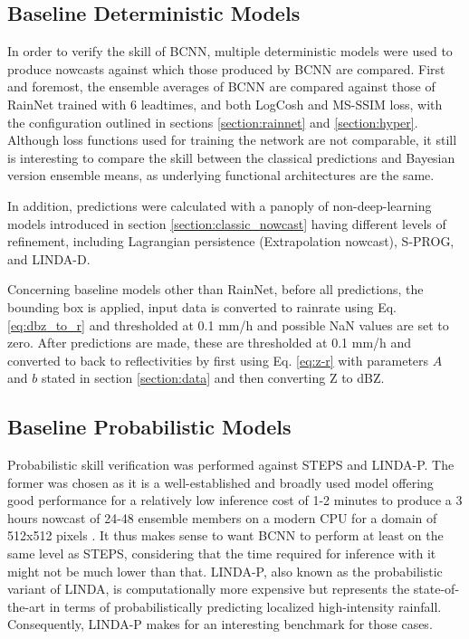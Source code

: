 \subsection{Baseline Deterministic Models}
\label{section:det_models}

In order to verify the skill of BCNN, multiple deterministic models were used to produce nowcasts against which those produced by BCNN are compared. First and foremost, the ensemble averages of BCNN are compared against those of RainNet trained with 6 leadtimes, and both LogCosh and MS-SSIM loss, with the configuration outlined in sections \ref{section:rainnet} and \ref{section:hyper}. Although loss functions used for training the network are not comparable, it still is interesting to compare the skill between the classical predictions and Bayesian version ensemble means, as underlying functional architectures are the same.

In addition, predictions were calculated with a panoply of non-deep-learning models introduced in section \ref{section:classic_nowcast} having different levels of refinement, including Lagrangian persistence (Extrapolation nowcast), S-PROG, and LINDA-D.

Concerning baseline models other than RainNet, before all predictions, the bounding box is applied, input data is converted to rainrate using Eq. \ref{eq:dbz_to_r} and thresholded at 0.1 mm/h and possible NaN values are set to zero. After predictions are made, these are thresholded at 0.1 mm/h and converted to back to reflectivities by first using Eq. \ref{eq:z-r} with parameters $A$ and $b$ stated in section \ref{section:data} and then converting Z to dBZ.


\subsection{Baseline Probabilistic Models}

Probabilistic skill verification was performed against STEPS and LINDA-P. The former was chosen as it is a well-established and broadly used model offering good performance for a relatively low inference cost of 1-2 minutes to produce a 3 hours nowcast of 24-48 ensemble members on a modern CPU for a domain of 512x512 pixels \cite{pulkkinen_pysteps_2019}. It thus makes sense to want BCNN to perform at least on the same level as STEPS, considering that the time required for inference with it might not be much lower than that. LINDA-P, also known as the probabilistic variant of LINDA, is computationally more expensive but represents the state-of-the-art in terms of probabilistically predicting localized high-intensity rainfall. Consequently, LINDA-P makes for an interesting benchmark for those cases. 


